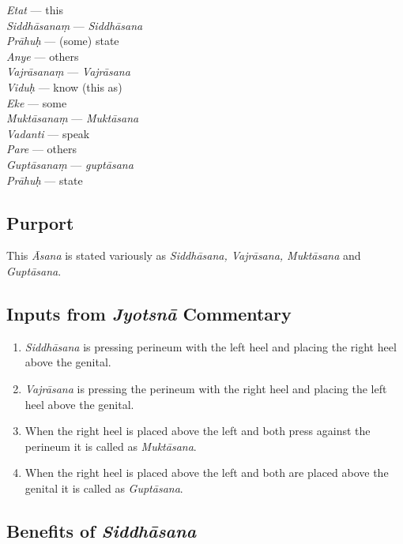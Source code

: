 \begin{multicols}{2}
\itemsep=0pt
\textit{Etat} --- this   \\
\textit{Siddhāsanaṃ} --- \textit{Siddhāsana}   \\
\textit{Prāhuḥ} --- (some) state \\
\textit{Anye} --- others   \\
\textit{Vajrāsanaṃ} --- \textit{Vajrāsana}  \\
\textit{Viduḥ} --- know (this as) \\
\textit{Eke} --- some \\
\textit{Muktāsanaṃ} --- \textit{Muktāsana}   \\
\textit{Vadanti} --- speak \\
\textit{Pare} --- others \\
\textit{Guptāsanaṃ} ---  \textit{guptāsana}  \\
\textit{Prāhuḥ} --- state  
\end{multicols}
\vspace{-10pt}

\subsection*{Purport}
\vspace{-10pt}

This \textit{Āsana} is stated variously as \textit{Siddhāsana, Vajrāsana, Muktāsana} and \textit{Guptāsana}.

\subsection*{Inputs from \textit{Jyotsnā} Commentary}

\begin{enumerate}
\itemsep=0pt
\item \textit{Siddhāsana} is pressing perineum with the left heel and placing the right heel above the genital. 
\item \textit{Vajrāsana} is pressing the perineum with the right heel and placing the left heel above the genital.
\item When the right heel is placed above the left and both press against the perineum it is called as \textit{Muktāsana}.
\item When the right heel is placed above the left and both are placed above the genital it is called as \textit{Guptāsana}.
\end{enumerate}

\subsection*{Benefits of \textit{Siddhāsana}}



